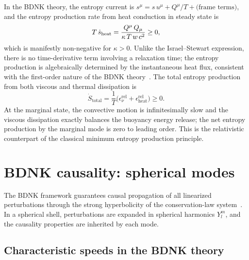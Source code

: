 In the BDNK theory, the entropy current is
$s^{\mu} = s\,u^{\mu} + Q^{\mu}/T + \text{(frame terms)}$, and the
entropy production rate from heat conduction in steady state is
\begin{equation}
  T\,\dot{s}_{\mathrm{heat}}
  = \frac{Q^{\mu}\,Q_{\mu}}{\kappa\,T\,w\,c^{2}} \geq 0,
  \label{eq:rel-entropy-prod}
\end{equation}
which is manifestly non-negative for $\kappa > 0$.  Unlike the
Israel--Stewart expression, there is no time-derivative term
involving a relaxation time; the entropy production is algebraically
determined by the instantaneous heat flux, consistent with the
first-order nature of the BDNK
theory~\cite{BemficaDN2018,Kovtun2019}.  The total entropy
production from both viscous and thermal dissipation is
\begin{equation}
  \dot{S}_{\mathrm{total}}
  = \frac{1}{T}\bigl(\epsilon_{\nu}^{\mathrm{rel}}
    + \epsilon_{\mathrm{heat}}^{\mathrm{rel}}\bigr)
  \geq 0.
  \label{eq:rel-entropy-total}
\end{equation}
At the marginal state, the convective motion is infinitesimally slow
and the viscous dissipation exactly balances the buoyancy energy
release; the net entropy production by the marginal mode is zero to
leading order.  This is the relativistic counterpart of the classical
minimum entropy production principle.


\section{BDNK causality: spherical modes}
\label{sec:rel-causality}

The BDNK framework guarantees causal propagation of all linearized
perturbations through the strong hyperbolicity of the conservation-law
system~\cite{BemficaDN2018,Kovtun2019,BemficaDNK2023}.  In a spherical
shell, perturbations are expanded in spherical harmonics $Y_{l}^{m}$,
and the causality properties are inherited by each mode.

\subsection{Characteristic speeds in the BDNK theory}
\label{sec:rel-causality-thermal}

